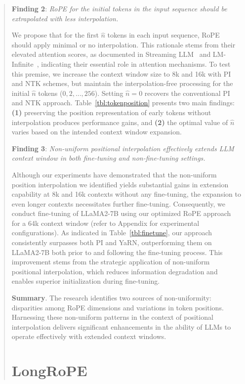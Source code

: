\begin{abstract}
\textbf{Finding 2}: \textit{RoPE for the initial tokens in the input sequence should be extrapolated with less interpolation.} 

We propose that for the first $\hat{n}$ tokens in each input sequence, RoPE should apply minimal or no interpolation. This rationale stems from their elevated attention scores, as documented in Streaming LLM~\cite{streamingllm} and LM-Infinite~\cite{han2023lminfinite}, indicating their essential role in attention mechanisms. To test this premise, we increase the context window size to 8k and 16k with PI and NTK schemes, but maintain the interpolation-free processing for the initial $\hat{n}$ tokens ($0, 2, ..., 256$). Setting $\hat{n}=0$ recovers the conventional PI and NTK approach. Table~\ref{tbl:tokenposition} presents two main findings: \textbf{(1)} preserving the position representation of early tokens without interpolation produces performance gains, and \textbf{(2)} the optimal value of $\hat n$ varies based on the intended context window expansion.

\textbf{Finding 3}: \textit{Non-uniform positional interpolation effectively extends LLM context window in both fine-tuning and non-fine-tuning settings.} 

Although our experiments have demonstrated that the non-uniform position interpolation we identified yields substantial gains in extension capability at 8k and 16k contexts without any fine-tuning, the expansion to even longer contexts necessitates further fine-tuning. Consequently, we conduct fine-tuning of LLaMA2-7B using our optimized RoPE approach for a 64k context window (refer to Appendix for experimental configurations). As indicated in Table~\ref{tbl:finetune}, our approach consistently surpasses both PI and YaRN, outperforming them on LLaMA2-7B both prior to and following the fine-tuning process. This improvement stems from the strategic application of non-uniform positional interpolation, which reduces information degradation and enables superior initialization during fine-tuning.

\textbf{Summary}. The research identifies two sources of non-uniformity: disparities among RoPE dimensions and variations in token positions. Harnessing these non-uniform patterns in the context of positional interpolation delivers significant enhancements in the ability of LLMs to operate effectively with extended context windows.

\section{LongRoPE}


\end{abstract}
